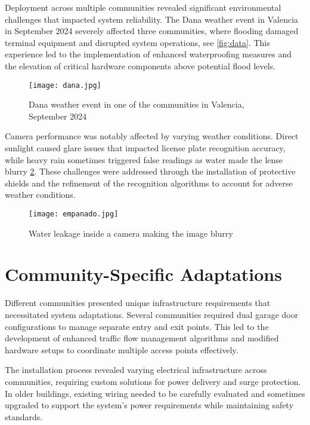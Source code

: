 Deployment across multiple communities revealed significant environmental challenges that impacted system reliability. The Dana weather event in Valencia in September 2024 \autocite{CNNSpainFlooding2024} severely affected three communities, where flooding damaged terminal equipment and disrupted system operations, see \cref{fig:data}. This experience led to the implementation of enhanced waterproofing measures and the elevation of critical hardware components above potential flood levels. 

\begin{figure}
        \texttt{[image: dana.jpg]}
    \caption{Dana weather event in one of the communities in Valencia, September 2024}\label{fig:dana}
\end{figure}

Camera performance was notably affected by varying weather conditions. Direct sunlight caused glare issues that impacted license plate recognition accuracy, while heavy rain sometimes triggered false readings as water made the lense blurry \cref{fig:wet_camera}. These challenges were addressed through the installation of protective shields and the refinement of the recognition algorithms to account for adverse weather conditions. 

\begin{figure}
        \texttt{[image: empanado.jpg]}
    \caption{Water leakage inside a camera making the image blurry}\label{fig:wet_camera}
\end{figure}

\section{Community-Specific Adaptations}

Different communities presented unique infrastructure requirements that necessitated system adaptations. Several communities required dual garage door configurations to manage separate entry and exit points. This led to the development of enhanced traffic flow management algorithms and modified hardware setups to coordinate multiple access points effectively. 

The installation process revealed varying electrical infrastructure across communities, requiring custom solutions for power delivery and surge protection. In older buildings, existing wiring needed to be carefully evaluated and sometimes upgraded to support the system's power requirements while maintaining safety standards.


